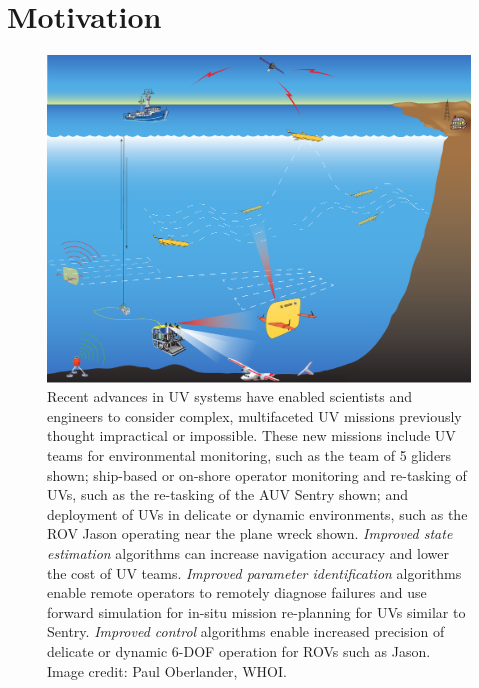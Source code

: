 \section{Motivation}

\begin{center}
  \begin{figure}[htbp]
     \begin{center}
       \includegraphics[width=\textwidth]{./pres/images/Adaptive4}
       \caption{Recent advances in \acf{UV} systems have enabled
         scientists and engineers to consider complex, multifaceted
         \ac{UV} missions previously thought impractical or
         impossible.  These new missions include \ac{UV} teams for
         environmental monitoring, such as the team of 5 gliders
         shown; ship-based or on-shore operator monitoring and
         re-tasking of \acp{UV}, such as the re-tasking of the
         \ac{AUV} Sentry shown; and deployment of \acp{UV} in delicate
         or dynamic environments, such as the \ac{ROV} Jason operating
         near the plane wreck shown.  {\it Improved state estimation}
         algorithms can increase navigation accuracy and lower the
         cost of \acs{UV} teams.  {\it Improved parameter
           identification} algorithms enable remote operators to
         remotely diagnose failures and use forward simulation for
         in-situ mission re-planning for \acp{UV} similar to Sentry.
         {\it Improved control} algorithms enable increased precision
         of delicate or dynamic 6-\acs{DOF} operation for \acp{ROV}
         such as Jason.  Image credit: Paul Oberlander, WHOI. }
\label{chIntro.fig.UVadaptive}
     \end{center}
  \end{figure}
\end{center}


